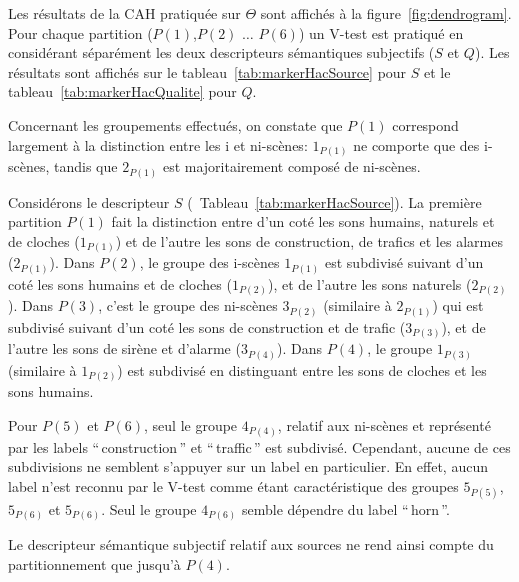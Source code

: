 Les résultats de la CAH pratiquée sur $\Theta$ sont affichés à la figure~\ref{fig:dendrogram}. Pour chaque partition ($P(1)$,$P(2)$ $\ldots$ $P(6)$) un V-test est pratiqué en considérant séparément les deux descripteurs sémantiques subjectifs ($S$ et $Q$). Les résultats sont affichés sur le tableau~\ref{tab:markerHacSource} pour $S$ et le tableau~\ref{tab:markerHacQualite} pour $Q$.

Concernant les groupements effectués, on constate que $P(1)$ correspond largement à la distinction entre les i et ni-scènes: $1_{P(1)}$ ne comporte que des i-scènes, tandis que $2_{P(1)}$ est majoritairement composé de ni-scènes.

Considérons le descripteur $S$ (\cf~Tableau~\ref{tab:markerHacSource}). La première partition $P(1)$ fait la distinction entre d'un coté les sons humains, naturels et de cloches ($1_{P(1)}$) et de l'autre les sons de construction, de trafics et les alarmes ($2_{P(1)}$). Dans $P(2)$, le groupe des i-scènes $1_{P(1)}$ est subdivisé suivant d'un coté les sons humains et de cloches ($1_{P(2)}$), et de l'autre les sons naturels ($2_{P(2)}$).  Dans $P(3)$, c'est le groupe des ni-scènes $3_{P(2)}$ (similaire à $2_{P(1)}$) qui est subdivisé suivant d'un coté les sons de construction et de trafic ($3_{P(3)}$), et de l'autre les sons de sirène et d'alarme ($3_{P(4)}$). Dans $P(4)$, le groupe $1_{P(3)}$ (similaire à $1_{P(2)}$) est subdivisé en distinguant entre les sons de cloches et les sons humains.

Pour $P(5)$ et $P(6)$, seul le groupe $4_{P(4)}$, relatif aux ni-scènes et représenté par les labels ``\,construction\,'' et ``\,traffic\,'' est subdivisé. Cependant, aucune de ces subdivisions ne semblent s'appuyer sur un label en particulier. En effet, aucun label n'est reconnu par le V-test comme étant caractéristique des groupes $5_{P(5)}$, $5_{P(6)}$ et $5_{P(6)}$. Seul le groupe $4_{P(6)}$ semble dépendre du label ``\,horn\,''. 

Le descripteur sémantique subjectif relatif aux sources ne rend ainsi compte du partitionnement que jusqu'à $P(4)$.

